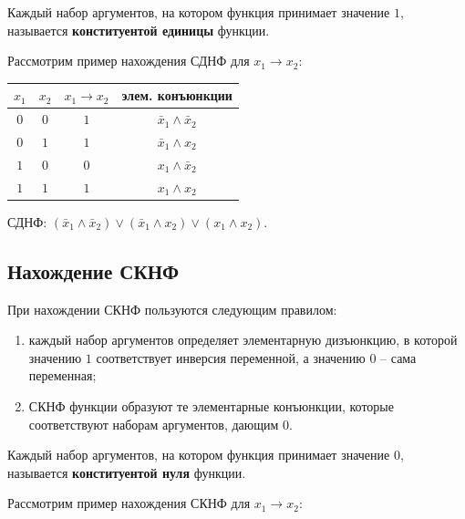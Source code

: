 \documentclass[a5paper, 11pt]{extarticle}
\theoremstyle{definition}
\theoremstyle{definition}
\theoremstyle{definition}
\numberwithin{figure}{section}
\numberwithin{table}{section}
\begin{document}
Каждый набор аргументов, на котором функция принимает значение \(1\), называется \textbf{конституентой единицы} функции.

Рассмотрим пример нахождения СДНФ для \(x_1 \to x_2\):

\begin{table}[H]
    \renewcommand{\arraystretch}{1.5}
    \begin{longtable}{|c|c|c|c|}
        \hline
        \(x_1\) & \(x_2\) & \(x_1 \to x_2\) & элем. конъюнкции              \\
        \hline
        \(0\)   & \(0\)   & \(1\)           & \(\bar{x}_1 \land \bar{x}_2\) \\
        \hline
        \(0\)   & \(1\)   & \(1\)           & \(\bar{x}_1 \land x_2\)       \\
        \hline
        \(1\)   & \(0\)   & \(0\)           & \(x_1 \land \bar{x}_2\)       \\
        \hline
        \(1\)   & \(1\)   & \(1\)           & \(x_1 \land x_2\)             \\
        \hline
    \end{longtable}
\end{table}

СДНФ: \((\bar{x}_1 \land \bar{x}_2) \lor (\bar{x}_1 \land x_2) \lor (x_1 \land x_2)\).

\subsection{Нахождение СКНФ}

\noindent При нахождении СКНФ пользуются следующим правилом:
\begin{enumerate}
    \item каждый набор аргументов определяет элементарную дизъюнкцию, в которой значению \(1\) соответствует инверсия переменной, а значению \(0\) -- сама переменная;
    \item СКНФ функции образуют те элементарные конъюнкции, которые соответствуют наборам аргументов, дающим \(0\).
\end{enumerate}

Каждый набор аргументов, на котором функция принимает значение \(0\), называется \textbf{конституентой нуля} функции.

Рассмотрим пример нахождения СКНФ для \(x_1 \to x_2\):
\end{document}
